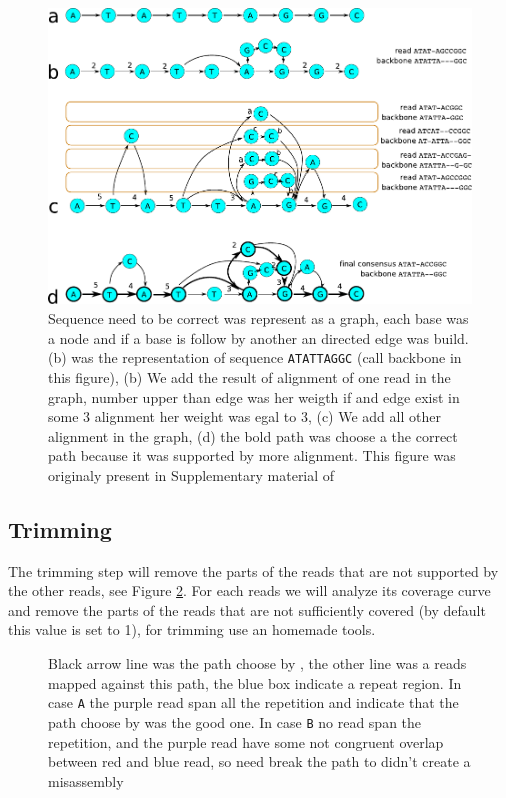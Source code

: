 \documentclass[main]{subfiles}
\begin{document}
\begin{figure}[ht]
    \centering
    \includegraphics[width=\textwidth]{state_of_the_art/images/POA_explain.pdf}
    \caption{Sequence need to be correct was represent as a graph, each base was a node and if a base is follow by another an directed edge was build. (b) was the representation of sequence \texttt{ATATTAGGC} (call backbone in this figure), (b) We add the result of alignment of one read in the graph, number upper than edge was her weigth if and edge exist in some 3 alignment her weight was egal to 3, (c) We add all other alignment in the graph, (d) the bold path was choose a the correct path because it was supported by more alignment. This figure was originaly present in Supplementary material of \hgap \cite{hgap}}
    \label{sota:fig:canu:correction}
\end{figure}

\subsection{Trimming}

The trimming step will remove the parts of the reads that are not supported by the other reads, see Figure \ref{sota:fig:canu:trimming}. For each reads we will analyze its coverage curve and remove the parts of the reads that are not sufficiently covered (by default this value is set to 1), for trimming \canu use an homemade tools. 


\begin{figure}[ht]
    \centering
    
    \caption{Black arrow line was the path choose by \canu, the other line was a reads mapped against this path, the blue box indicate a repeat region. In case \texttt{A} the purple read span all the repetition and indicate that the path choose by \canu was the good one. In case \texttt{B} no read span the repetition, and the purple read have some not congruent overlap between red and blue read, so \canu need break the path to didn't create a misassembly}
    \label{sota:fig:canu:trimming}
\end{figure}
\end{document}
